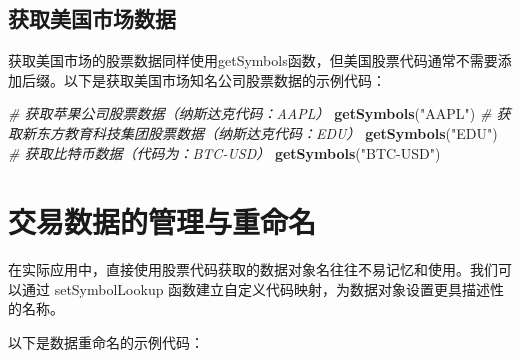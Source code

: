 \documentclass[]{ctexbook}
\newenvironment{Shaded}{\begin{snugshade}}{\end{snugshade}}
\newcommand{\CommentTok}[1]{\textcolor[rgb]{0.56,0.35,0.01}{\textit{#1}}}
\newcommand{\FunctionTok}[1]{\textcolor[rgb]{0.13,0.29,0.53}{\textbf{#1}}}
\newcommand{\NormalTok}[1]{#1}
\newcommand{\StringTok}[1]{\textcolor[rgb]{0.31,0.60,0.02}{#1}}
\begin{document}
\subsection{获取美国市场数据}\label{ux83b7ux53d6ux7f8eux56fdux5e02ux573aux6570ux636e}

获取美国市场的股票数据同样使用getSymbols函数，但美国股票代码通常不需要添加后缀。以下是获取美国市场知名公司股票数据的示例代码：

\begin{Shaded}
\begin{Highlighting}[]
\CommentTok{\# 获取苹果公司股票数据（纳斯达克代码：AAPL）}
\FunctionTok{getSymbols}\NormalTok{(}\StringTok{"AAPL"}\NormalTok{)}
\CommentTok{\# 获取新东方教育科技集团股票数据（纳斯达克代码：EDU）}
\FunctionTok{getSymbols}\NormalTok{(}\StringTok{"EDU"}\NormalTok{)}
\CommentTok{\# 获取比特币数据（代码为：BTC{-}USD）}
\FunctionTok{getSymbols}\NormalTok{(}\StringTok{"BTC{-}USD"}\NormalTok{)}
\end{Highlighting}
\end{Shaded}

\section{交易数据的管理与重命名}\label{ux4ea4ux6613ux6570ux636eux7684ux7ba1ux7406ux4e0eux91cdux547dux540d}

在实际应用中，直接使用股票代码获取的数据对象名往往不易记忆和使用。我们可以通过 setSymbolLookup 函数建立自定义代码映射，为数据对象设置更具描述性的名称。

以下是数据重命名的示例代码：
\end{document}
